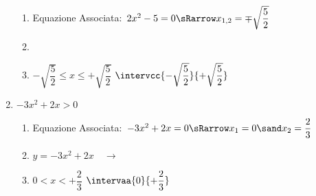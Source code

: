 \begin{esempio}
\begin{enumerate}
\begin{enumerate}
 \item
  Equazione Associata:~\(2x^2-5=0 \sRarrow 
                        x_{1, 2}= \mp \sqrt{\dfrac{5}{2}}\)
 \item 
  {}
 \item 
 
\insiemesoluzione
  {}
  {\(-\sqrt{\dfrac{5}{2}} \le x \le +\sqrt{\dfrac{5}{2}}\)}
  {\(\intervcc{-\sqrt{\dfrac{5}{2}}}{+\sqrt{\dfrac{5}{2}}}\)}
\end{enumerate}

\item \(-3x^2 + 2x > 0\)

\begin{enumerate}
 \item
  Equazione Associata:~\(-3x^2 + 2x=0 \sRarrow 
                        x_{1}= 0 \sand x_{2}= \dfrac{2}{3}\)
 \item 
 \funzioneassociata
   {\(y = -3x^2 + 2x \quad \rightarrow\)}
   {}
 \item 
 \insiemesoluzione
   {}
   {\(0 < x < +\dfrac{2}{3}\)}
   {\(\intervaa{0}{+\dfrac{2}{3}}\)}
\end{enumerate}

\end{enumerate}
\end{esempio}

